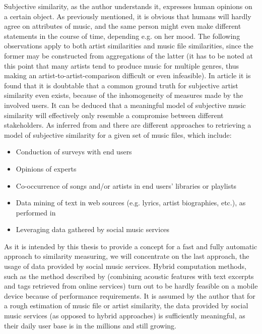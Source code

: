 Subjective similarity, as the author understands it, expresses human opinions on a certain object. As previously mentioned, it is obvious that humans will hardly agree on attributes of music, and the same person might even make different statements in the course of time, depending e.g. on her mood. The following observations apply to both artist similarities and music file similarities, since the former may be constructed from aggregations of the latter (it has to be noted at this point that many artists tend to produce music for multiple genres, thus making an artist-to-artist-comparison difficult or even infeasible). In article \cite{Ellis02thequest} it is found that it is doubtable that a common ground truth for subjective artist similarity even exists, because of the inhomogeneity of measures made by the involved users. It can be deduced that a meaningful model of subjective music similarity will effectively only resemble a compromise between different stakeholders.
As inferred from \cite{Berenzweig03alarge-scale} and \cite{mcfee09-hesas} there are different approaches to retrieving a model of subjective similarity for a given set of music files, which include:

\begin{itemize}
	\item Conduction of surveys with end users
	\item Opinions of experts
	\item Co-occurrence of songs and/or artists in end users' libraries or playlists
	\item Data mining of text in web sources (e.g. lyrics, artist biographies, etc.), as performed in \cite{Whitman02inferringdescriptions}
	\item Leveraging data gathered by social music services
\end{itemize}

As it is intended by this thesis to provide a concept for a fast and fully automatic approach to similarity measuring, we will concentrate on the last approach, the usage of data provided by social music services. Hybrid computation methods, such as the method described by \cite{mcfee09-hesas} (combining acoustic features with text excerpts and tags retrieved from online services) turn out to be hardly feasible on a mobile device because of performance requirements. It is assumed by the author that for a rough estimation of music file or artist similarity, the data provided by social music services (as opposed to hybrid approaches) is sufficiently meaningful, as their daily user base is in the millions and still growing.

